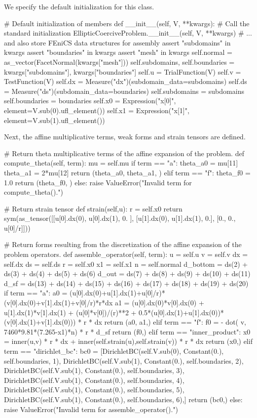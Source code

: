 We specify the default initialization for this class. 
\begin{python}
	# Default initialization of members
	def __init__(self, V, **kwargs):
		# Call the standard initialization
		EllipticCoerciveProblem.__init__(self, V, **kwargs)
		# ... and also store FEniCS data structures for assembly
		assert "subdomains" in kwargs
		assert "boundaries" in kwargs
		assert "mesh" in kwargs
		self.normal = as_vector(FacetNormal(kwargs["mesh"]))
		self.subdomains, self.boundaries = kwargs["subdomains"], kwargs["boundaries"]
		self.u = TrialFunction(V)
		self.v = TestFunction(V)
		self.dx = Measure("dx")(subdomain_data=subdomains)
		self.ds = Measure("ds")(subdomain_data=boundaries)
		self.subdomains = subdomains
		self.boundaries = boundaries
		self.x0 = Expression("x[0]", element=V.sub(0).ufl_element())
		self.x1 = Expression("x[1]", element=V.sub(1).ufl_element())
\end{python}

Next, the affine multiplicative terms, weak forms and strain tensors are defined.
\begin{python}
	# Return theta multiplicative terms of the affine expansion of the problem.
	def compute_theta(self, term):
		mu = self.mu
		if term == "a":
			theta_a0 = mu[11]
			theta_a1 = 2*mu[12]
			return (theta_a0, theta_a1, )
		elif term == "f":
			theta_f0 = 1.0
			return (theta_f0, )
		else:
			raise ValueError("Invalid term for compute_theta().")

	# Return strain tensor
	def strain(self,u):
		r = self.x0
		return sym(as_tensor([[u[0].dx(0), u[0].dx(1), 0. ], [u[1].dx(0), u[1].dx(1), 0.], [0., 0., u[0]/r]]))

	# Return forms resulting from the discretization of the affine expansion of the problem operators.
	def assemble_operator(self, term):
		u = self.u
		v = self.v
		dx = self.dx
		ds = self.ds
		r = self.x0
		x1 = self.x1
		n = self.normal
		d_bottom = ds(2) + ds(3) + ds(4) + ds(5) + ds(6)
		d_out = ds(7) + ds(8) + ds(9) + ds(10) + ds(11)
		d_sf = ds(13) + ds(14) + ds(15) + ds(16) + ds(17) + ds(18) + ds(19) + ds(20)
		if term == "a":
			a0 = (u[0].dx(0)+u[1].dx(1)+u[0]/r)*(v[0].dx(0)+v[1].dx(1)+v[0]/r)*r*dx
			a1 = (u[0].dx(0)*v[0].dx(0) + u[1].dx(1)*v[1].dx(1) + (u[0]*v[0])/(r)**2 + 0.5*(u[0].dx(1)+u[1].dx(0))*(v[0].dx(1)+v[1].dx(0))) * r * dx
			return (a0, a1,)
		elif term == "f":
			f0 = - dot( v, 7460*9.81*(7.265-x1)*n) * r * d_sf
			return (f0,)
		elif term == "inner_product":
			x0 = inner(u,v) * r * dx + inner(self.strain(u),self.strain(v)) * r * dx
			return (x0,)
		elif term == "dirichlet_bc":
			bc0 = [DirichletBC(self.V.sub(0), Constant(0.), self.boundaries, 1),
				DirichletBC(self.V.sub(1), Constant(0.), self.boundaries, 2),
				DirichletBC(self.V.sub(1), Constant(0.), self.boundaries, 3),
				DirichletBC(self.V.sub(1), Constant(0.), self.boundaries, 4),
				DirichletBC(self.V.sub(1), Constant(0.), self.boundaries, 5),
				DirichletBC(self.V.sub(1), Constant(0.), self.boundaries, 6),]
			return (bc0,)
		else:
			raise ValueError("Invalid term for assemble_operator().")
\end{python}


